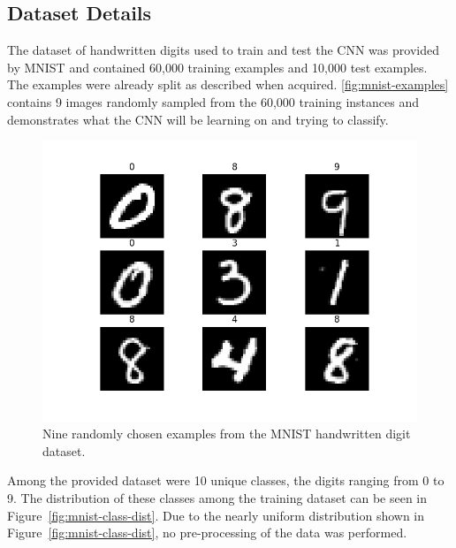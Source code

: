 \documentclass[a4paper]{article}
\begin{document}
\subsection{Dataset Details}
The dataset of handwritten digits used to train and test the CNN was provided by MNIST and contained 60,000 training examples and 10,000 test examples. The examples were already split as described when acquired. \autoref{fig:mnist-examples} contains 9 images randomly sampled from the 60,000 training instances and demonstrates what the CNN will be learning on and trying to classify.

\begin{figure}[h!]
    \centering
    \includegraphics[scale=0.5]{images/mnist-examples.png}
    \caption{Nine randomly chosen examples from the MNIST handwritten digit dataset.}
    \label{fig:mnist-examples}
\end{figure}

Among the provided dataset were 10 unique classes, the digits ranging from 0 to 9. The distribution of these classes among the training dataset can be seen in Figure~\ref{fig:mnist-class-dist}. Due to the nearly uniform distribution shown in Figure~\ref{fig:mnist-class-dist}, no pre-processing of the data was performed.
\end{document}
